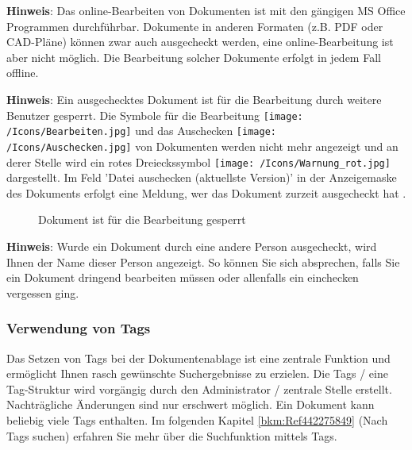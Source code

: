\textbf{Hinweis}: Das online-Bearbeiten von Dokumenten ist mit den gängigen MS Office Programmen durchführbar. Dokumente in anderen Formaten (z.B. PDF oder CAD-Pläne) können zwar auch ausgecheckt werden, eine online-Bearbeitung ist aber nicht möglich. Die Bearbeitung solcher Dokumente erfolgt in jedem Fall offline. \newline

\textbf{Hinweis}: Ein ausgechecktes Dokument ist für die Bearbeitung durch weitere Benutzer gesperrt. Die Symbole für die Bearbeitung \texttt{[image: /Icons/Bearbeiten.jpg]} und das Auschecken \texttt{[image: /Icons/Auschecken.jpg]} von Dokumenten werden nicht mehr angezeigt und an derer Stelle wird ein rotes Dreieckssymbol \texttt{[image: /Icons/Warnung\_rot.jpg]}  dargestellt. Im Feld 'Datei auschecken (aktuellste Version)' in der Anzeigemaske des Dokuments erfolgt eine Meldung, wer das Dokument zurzeit ausgecheckt hat .

\begin{figure}[H]
\caption{Dokument ist für die Bearbeitung gesperrt}
\end{figure}

\textbf{Hinweis}: Wurde ein Dokument durch eine andere Person ausgecheckt, wird Ihnen der Name dieser Person angezeigt. So können Sie sich absprechen, falls Sie ein Dokument dringend bearbeiten müssen oder allenfalls ein einchecken vergessen ging.

\pagebreak
\subsubsection{Verwendung von Tags}
\label{bkm:Ref201801219}

Das Setzen von Tags bei der Dokumentenablage ist eine zentrale Funktion und ermöglicht Ihnen rasch gewünschte Suchergebnisse zu erzielen. Die Tags / eine Tag-Struktur wird vorgängig durch den Administrator / zentrale Stelle erstellt. Nachträgliche Änderungen sind nur erschwert möglich. Ein Dokument kann beliebig viele Tags enthalten. Im folgenden Kapitel \ref{bkm:Ref442275849} (Nach Tags suchen) erfahren Sie mehr über die Suchfunktion mittels Tags.

